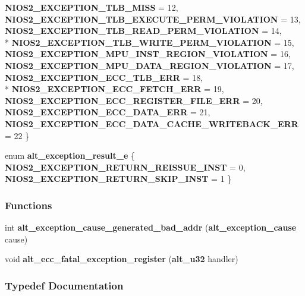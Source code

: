 \begin{DoxyCompactItemize}
{\bf N\+I\+O\+S2\+\_\+\+E\+X\+C\+E\+P\+T\+I\+O\+N\+\_\+\+T\+L\+B\+\_\+\+M\+I\+SS} = 12, 
{\bf N\+I\+O\+S2\+\_\+\+E\+X\+C\+E\+P\+T\+I\+O\+N\+\_\+\+T\+L\+B\+\_\+\+E\+X\+E\+C\+U\+T\+E\+\_\+\+P\+E\+R\+M\+\_\+\+V\+I\+O\+L\+A\+T\+I\+ON} = 13, 
{\bf N\+I\+O\+S2\+\_\+\+E\+X\+C\+E\+P\+T\+I\+O\+N\+\_\+\+T\+L\+B\+\_\+\+R\+E\+A\+D\+\_\+\+P\+E\+R\+M\+\_\+\+V\+I\+O\+L\+A\+T\+I\+ON} = 14, 
\\*
{\bf N\+I\+O\+S2\+\_\+\+E\+X\+C\+E\+P\+T\+I\+O\+N\+\_\+\+T\+L\+B\+\_\+\+W\+R\+I\+T\+E\+\_\+\+P\+E\+R\+M\+\_\+\+V\+I\+O\+L\+A\+T\+I\+ON} = 15, 
{\bf N\+I\+O\+S2\+\_\+\+E\+X\+C\+E\+P\+T\+I\+O\+N\+\_\+\+M\+P\+U\+\_\+\+I\+N\+S\+T\+\_\+\+R\+E\+G\+I\+O\+N\+\_\+\+V\+I\+O\+L\+A\+T\+I\+ON} = 16, 
{\bf N\+I\+O\+S2\+\_\+\+E\+X\+C\+E\+P\+T\+I\+O\+N\+\_\+\+M\+P\+U\+\_\+\+D\+A\+T\+A\+\_\+\+R\+E\+G\+I\+O\+N\+\_\+\+V\+I\+O\+L\+A\+T\+I\+ON} = 17, 
{\bf N\+I\+O\+S2\+\_\+\+E\+X\+C\+E\+P\+T\+I\+O\+N\+\_\+\+E\+C\+C\+\_\+\+T\+L\+B\+\_\+\+E\+RR} = 18, 
\\*
{\bf N\+I\+O\+S2\+\_\+\+E\+X\+C\+E\+P\+T\+I\+O\+N\+\_\+\+E\+C\+C\+\_\+\+F\+E\+T\+C\+H\+\_\+\+E\+RR} = 19, 
{\bf N\+I\+O\+S2\+\_\+\+E\+X\+C\+E\+P\+T\+I\+O\+N\+\_\+\+E\+C\+C\+\_\+\+R\+E\+G\+I\+S\+T\+E\+R\+\_\+\+F\+I\+L\+E\+\_\+\+E\+RR} = 20, 
{\bf N\+I\+O\+S2\+\_\+\+E\+X\+C\+E\+P\+T\+I\+O\+N\+\_\+\+E\+C\+C\+\_\+\+D\+A\+T\+A\+\_\+\+E\+RR} = 21, 
{\bf N\+I\+O\+S2\+\_\+\+E\+X\+C\+E\+P\+T\+I\+O\+N\+\_\+\+E\+C\+C\+\_\+\+D\+A\+T\+A\+\_\+\+C\+A\+C\+H\+E\+\_\+\+W\+R\+I\+T\+E\+B\+A\+C\+K\+\_\+\+E\+RR} = 22
 \}
\item 
enum {\bf alt\+\_\+exception\+\_\+result\+\_\+e} \{ {\bf N\+I\+O\+S2\+\_\+\+E\+X\+C\+E\+P\+T\+I\+O\+N\+\_\+\+R\+E\+T\+U\+R\+N\+\_\+\+R\+E\+I\+S\+S\+U\+E\+\_\+\+I\+N\+ST} = 0, 
{\bf N\+I\+O\+S2\+\_\+\+E\+X\+C\+E\+P\+T\+I\+O\+N\+\_\+\+R\+E\+T\+U\+R\+N\+\_\+\+S\+K\+I\+P\+\_\+\+I\+N\+ST} = 1
 \}
\end{DoxyCompactItemize}
\subsubsection*{Functions}
\begin{DoxyCompactItemize}
\item 
int {\bf alt\+\_\+exception\+\_\+cause\+\_\+generated\+\_\+bad\+\_\+addr} ({\bf alt\+\_\+exception\+\_\+cause} cause)
\item 
void {\bf alt\+\_\+ecc\+\_\+fatal\+\_\+exception\+\_\+register} ({\bf alt\+\_\+u32} handler)
\end{DoxyCompactItemize}


\subsubsection{Typedef Documentation}
